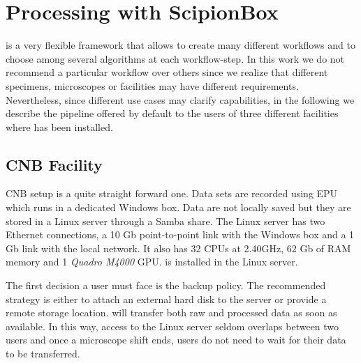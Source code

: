 \section{Processing with ScipionBox}

\scipionbox is a very flexible framework that allows to create many different workflows and to choose among several algorithms at each workflow-step. In this work we do not recommend a particular workflow 
over others since we realize that different specimens, microscopes or facilities may have different requirements. Nevertheless, since different use cases may clarify \scipionbox capabilities, in the following we describe the pipeline offered by default to the users of three different facilities where \scipionbox has been installed.

\subsection{CNB Facility}

CNB setup is a quite straight forward one. Data sets are recorded using EPU which runs in a dedicated Windows box. Data are not locally saved but they are stored in a Linux server through a Samba share. The Linux server has two Ethernet connections, a 10 Gb point-to-point link with the Windows box and a 1 Gb link with the local network. It also has 32 CPUs at 2.40GHz, 62 Gb of RAM memory and 1 \textit{Quadro M4000} GPU. \scipionbox is installed in the Linux server. 

The first decision a user must face is the backup policy. The recommended strategy is either to attach an external hard disk to the server or provide a remote storage location. \scipionbox will transfer both raw and processed data as soon as available. In this way, access to the Linux server seldom overlaps between two users and once a microscope shift ends, users do not need to wait for their data to be transferred. 

